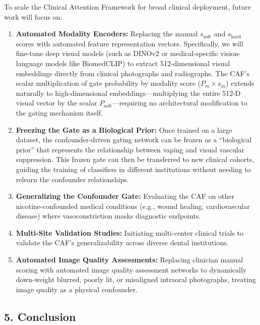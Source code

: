 \documentclass[
]{article}
\begin{document}
To scale the Clinical Attention Framework for broad clinical deployment,
future work will focus on:

\begin{enumerate}
\def\labelenumi{\arabic{enumi}.}
\item
  \textbf{Automated Modality Encoders:} Replacing the manual
  \(s_{\text{soft}}\) and \(s_{\text{hard}}\) scores with automated
  feature representation vectors. Specifically, we will fine-tune deep
  visual models (such as DINOv2 or medical-specific vision-language
  models like BiomedCLIP) to extract 512-dimensional visual embeddings
  directly from clinical photographs and radiographs. The CAF's scalar
  multiplication of gate probability by modality score
  (\(P_{m} \times s_{m}\)) extends naturally to high-dimensional
  embeddings---multiplying the entire 512-D visual vector by the scalar
  \(P_{\text{soft}}\)---requiring no architectural modification to the
  gating mechanism itself.
\item
  \textbf{Freezing the Gate as a Biological Prior:} Once trained on a
  large dataset, the confounder-driven gating network can be frozen as a
  ``biological prior'' that represents the relationship between vaping
  and visual vascular suppression. This frozen gate can then be
  transferred to new clinical cohorts, guiding the training of
  classifiers in different institutions without needing to relearn the
  confounder relationships.
\item
  \textbf{Generalizing the Confounder Gate:} Evaluating the CAF on other
  nicotine-confounded medical conditions (e.g., wound healing,
  cardiovascular disease) where vasoconstriction masks diagnostic
  endpoints.
\item
  \textbf{Multi-Site Validation Studies:} Initiating multi-center
  clinical trials to validate the CAF's generalizability across diverse
  dental institutions.
\item
  \textbf{Automated Image Quality Assessments:} Replacing clinician
  manual scoring with automated image quality assessment networks to
  dynamically down-weight blurred, poorly lit, or misaligned intraoral
  photographs, treating image quality as a physical confounder.
\end{enumerate}

\subsection{\texorpdfstring{\textbf{5.
Conclusion}}{5. Conclusion}}\label{conclusion}
\end{document}
